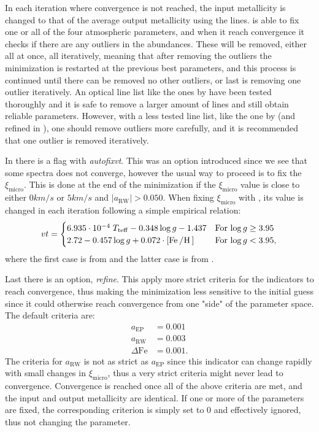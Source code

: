 In each iteration where convergence is not reached, the input metallicity is
changed to that of the average output metallicity using the  lines.
\FASMA is able to fix one or all of the four atmospheric parameters, and when it
reach convergence it checks if there are any outliers in the abundances. These
will be removed, either all at once, all iteratively, meaning that after
removing the outliers the minimization is restarted at the previous best
parameters, and this process is continued until there can be removed no other
outliers, or last is removing one outlier iteratively. An optical line list like
the ones by \citet{Sousa2008a,Tsantaki2013} have been tested thoroughly and it
is safe to remove a larger amount of lines and still obtain reliable parameters.
However, with a less tested line list, like the one by \citet{Andreasen2016}
(and refined in \citet{Andreasen2017b}), one should remove outliers more
carefully, and it is recommended that one outlier is removed iteratively.

In  there is a flag with \emph{autofixvt}. This was an
option introduced since we see that some spectra does not converge, however the
usual way to proceed is to fix the $\xi_\mathrm{micro}$. This is done at the end
of the minimization if the $\xi_\mathrm{micro}$ value is close to either
$0\si{km/s}$ or $5\si{km/s}$ and $|a_\mathrm{RW}| > 0.050$. When fixing
$\xi_\mathrm{micro}$ with \FASMA, its value is changed in each iteration
following a simple empirical relation:
\begin{align}
  vt = \begin{cases}
    6.935 \cdot 10^{-4}\; T_\mathrm{teff} - 0.348 \log g - 1.437     & \text{For $\log g \ge 3.95$} \\
    2.72 - 0.457 \log g + 0.072 \cdot [\ion{Fe}/\ion{H}]             & \text{For $\log g < 3.95$},
\end{cases}
\end{align}
where the first case is from \citet{Tsantaki2013} and the latter case is from
\citet{Adibekyan2015}.

Last there is an option, \emph{refine}. This apply more strict criteria for the
indicators to reach convergence, thus making the minimization less sensitive to
the initial guess since it could otherwise reach convergence from one "side" of
the parameter space. The default criteria are:
\begin{align*}
  a_\mathrm{EP}     &= 0.001\\
  a_\mathrm{RW}     &= 0.003\\
  \Delta\mathrm{Fe} &= 0.001.
\end{align*}
The criteria for $a_\mathrm{RW}$ is not as strict as $a_\mathrm{EP}$ since this
indicator can change rapidly with small changes in $\xi_\mathrm{micro}$, thus a
very strict criteria might never lead to convergence. Convergence is reached
once all of the above criteria are met, and the input and output metallicity are
identical. If one or more of the parameters are fixed, the corresponding
criterion is simply set to 0 and effectively ignored, thus not changing the
parameter.


